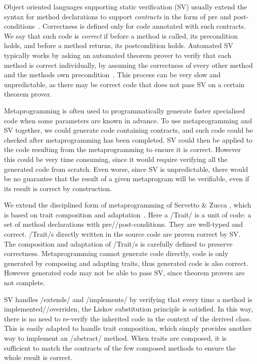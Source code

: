 \noindent Object oriented languages supporting static verification (SV) usually extend the syntax for method declarations
to support \emph{contracts} in the form of pre and post-conditions~\cite{Meyer:1988:OSC:534929}.
Correctness is defined only for code annotated with such contracts.
We say that such code is \emph{correct} if 
before a method is called, its precondition holds, and before a method returns, its postcondition holds.
Automated SV typically works by asking an automated theorem prover to verify that each method is correct individually, by assuming the correctness of every other method and the methods own precondition~\cite{barnett2004spec}. This process can be very slow and unpredictable,
as %
there may be correct code that does not pass SV on a certain theorem prover.

Metaprogramming is often used to programmatically generate faster specialised code 
when some parameters are known in advance. %
To use metaprogramming and SV together, we could generate code
containing contracts, and such code could be checked after metaprogramming has been completed.
SV could then be applied to the code resulting from the metaprogramming to ensure it is correct.
However this could be very time consuming, since it would require verifying all the generated code from scratch.
Even worse, since SV is unpredictable, there would be no guarantee that the result of a given metaprogram will be verifiable, even if its result is correct by construction.

We extend the disciplined form of metaprogramming of Servetto \& Zucca \cite{servetto2014meta}, which is based on trait composition and adaptation~\cite{scharli2003traits}.
Here a /Trait/ is a unit of code: a set of method declarations with pre//post-conditions.
They are well-typed and correct.
/Trait/s directly written in the source code
are proven correct by SV.
The composition and adaptation of /Trait/s is carefully defined to preserve correctness.
%
%
Metaprogramming cannot generate code directly, code is only generated by composing and adapting traits, thus generated code is also correct.
However generated code may not be able to pass SV, since theorem provers are not complete.

SV handles /extends/ and /implements/ by verifying that every 
time a method is implemented//overriden, 
the Liskov substitution principle is satisfied. In this way, there is no need to re-verify
the inherited code in the context of the derived class.
This is easily adapted
to handle trait composition, which simply provides another way to implement an /abstract/ method.
When traits are composed,
it is sufficient
to match the contracts of the few composed methods
to ensure the whole result is correct.

